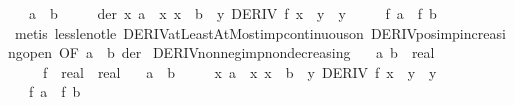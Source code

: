\begin{isabellebody}
\ \ \ {\isachardoublequoteopen}a\ {\isacharless}{\kern0pt}\ b{\isachardoublequoteclose}\isanewline
\ \ \ \ \ der{\isacharcolon}{\kern0pt}\ {\isachardoublequoteopen}{\isasymAnd}x{\isachardot}{\kern0pt}\ {\isasymlbrakk}a\ {\isasymle}\ x{\isacharsemicolon}{\kern0pt}\ x\ {\isasymle}\ b{\isasymrbrakk}\ {\isasymLongrightarrow}\ {\isasymexists}y{\isachardot}{\kern0pt}\ DERIV\ f\ x\ {\isacharcolon}{\kern0pt}{\isachargreater}{\kern0pt}\ y\ {\isasymand}\ y\ {\isachargreater}{\kern0pt}\ {}{\isachardoublequoteclose}\isanewline
\ \ \ {\isachardoublequoteopen}f\ a\ {\isacharless}{\kern0pt}\ f\ b{\isachardoublequoteclose}\isanewline
%
\isadelimproof
\ \ %
\endisadelimproof
%
\isatagproof
{}\isamarkupfalse%
\ {\isacharparenleft}{\kern0pt}metis\ less{\isacharunderscore}{\kern0pt}le{\isacharunderscore}{\kern0pt}not{\isacharunderscore}{\kern0pt}le\ DERIV{\isacharunderscore}{\kern0pt}atLeastAtMost{\isacharunderscore}{\kern0pt}imp{\isacharunderscore}{\kern0pt}continuous{\isacharunderscore}{\kern0pt}on\ DERIV{\isacharunderscore}{\kern0pt}pos{\isacharunderscore}{\kern0pt}imp{\isacharunderscore}{\kern0pt}increasing{\isacharunderscore}{\kern0pt}open\ {\isacharbrackleft}{\kern0pt}OF\ {\isacartoucheopen}a\ {\isacharless}{\kern0pt}\ b{\isacartoucheclose}{\isacharbrackright}{\kern0pt}\ der{\isacharparenright}{\kern0pt}%
\endisatagproof
{\isafoldproof}%
%
\isadelimproof
\isanewline
%
\endisadelimproof
\isanewline
{}\isamarkupfalse%
\ DERIV{\isacharunderscore}{\kern0pt}nonneg{\isacharunderscore}{\kern0pt}imp{\isacharunderscore}{\kern0pt}nondecreasing{\isacharcolon}{\kern0pt}\isanewline
\ \ \ a\ b\ {\isacharcolon}{\kern0pt}{\isacharcolon}{\kern0pt}\ real\isanewline
\ \ \ \ \ f\ {\isacharcolon}{\kern0pt}{\isacharcolon}{\kern0pt}\ {\isachardoublequoteopen}real\ {\isasymRightarrow}\ real{\isachardoublequoteclose}\isanewline
\ \ \ {\isachardoublequoteopen}a\ {\isasymle}\ b{\isachardoublequoteclose}\isanewline
\ \ \ \ \ {\isachardoublequoteopen}{\isasymAnd}x{\isachardot}{\kern0pt}\ {\isasymlbrakk}a\ {\isasymle}\ x{\isacharsemicolon}{\kern0pt}\ x\ {\isasymle}\ b{\isasymrbrakk}\ {\isasymLongrightarrow}\ {\isasymexists}y{\isachardot}{\kern0pt}\ DERIV\ f\ x\ {\isacharcolon}{\kern0pt}{\isachargreater}{\kern0pt}\ y\ {\isasymand}\ y\ {\isasymge}\ {}{\isachardoublequoteclose}\isanewline
\ \ \ {\isachardoublequoteopen}f\ a\ {\isasymle}\ f\ b{\isachardoublequoteclose}\isanewline
%
\isadelimproof
%
\endisadelimproof

\end{isabellebody}
